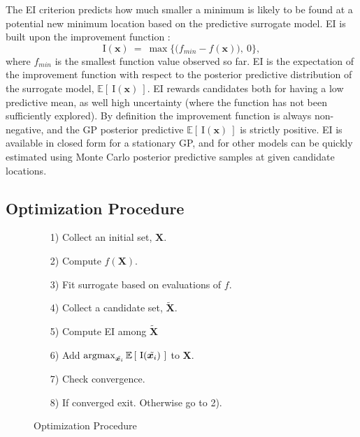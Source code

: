 \documentclass[12pt]{article}
\newcommand{\E}[1]{
        \mathbb{E}\left[~#1~\right]
}
\newcommand{\argmax}{\operatornamewithlimits{argmax}}
\def \Eix {
        \mathbb{E}\left[~\text{I}(\bm{x})~\right]
}
\def \ix {
        \text{I}(\bm{x})
}
\begin{document}
%
The EI criterion predicts how much smaller a minimum is likely to be found at a potential new minimum location based on the predictive surrogate model.  EI is built upon the improvement function \citep{jonesEIOpt}:
%
\begin{equation}
\ix~=~ \max \Big\{ \big(f_{min} - f(\bm{x})\big), ~0 \Big\},
\label{ix}
\end{equation}
%
where $f_{min}$ is the smallest function value observed so far.  EI is the expectation of the improvement function with respect to the posterior predictive distribution of the surrogate model, $\Eix$.
EI rewards candidates both for having a low predictive mean, as well high uncertainty (where the function has not been sufficiently explored).
%
By definition the improvement function is always non-negative, and the GP posterior predictive $\Eix$ is strictly positive.
%
EI is available in closed form for a stationary GP, and for other models can be quickly estimated using Monte Carlo posterior predictive samples at given candidate locations.

%
%
\subsection{Optimization Procedure}
%
%

%
%
\begin{figure}
        \vspace{-1.6cm}
        \singlespacing
        \caption{Optimization Procedure}
        \begin{itemize}
        \item[1)] Collect an initial set, $\bm{X}$.
        \item[2)] Compute $f(\bm{X})$.
        \item[3)] Fit surrogate based on evaluations of $f$.
        \item[4)] Collect a candidate set, $\tilde{\bm{X}}$.
        \item[5)] Compute EI among $\tilde{\bm{X}}$
        \item[6)] Add $\argmax_{\tilde{\bm{x}_i}} \E{\text{I}(\tilde{\bm{x}_i})}$ to $\bm{X}$.
        \item[7)] Check convergence.
        \item[8)] If converged exit. Otherwise go to 2).
        \end{itemize}
        \doublespacing
        \label{procedure}
\end{figure}
%
%
\end{document}
